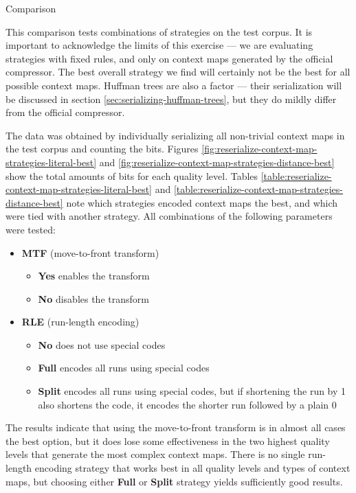 \documentclass[english,master,dept460,male,cpp,cpdeclaration]{diploma}
\makeatletter
\renewcommand\paragraph
	{\@startsection{paragraph}{4}{\z@}
	{-3.25ex plus 1ex minus .2ex}
	{1.5ex plus .2ex}
	{\normalfont\normalsize\bfseries}}
\newcommand{\subfoursection}[1]{\paragraph{#1}}
\newcommand{\nosep}{\itemsep0em}
\makeatother
\begin{document}
			\subfoursection{Comparison}
			
			This comparison tests combinations of strategies on the test corpus. It is important to acknowledge the limits of this exercise --- we are evaluating  strategies with fixed rules, and only on context maps generated by the official compressor. The best overall strategy we find will certainly not be the best for all possible context maps. Huffman trees are also a factor --- their serialization will be discussed in section \ref{sec:serializing-huffman-trees}, but they do mildly differ from the official compressor.
			
			The data was obtained by individually serializing all non-trivial context maps in the test corpus and counting the bits. Figures \ref{fig:reserialize-context-map-strategies-literal-best} and \ref{fig:reserialize-context-map-strategies-distance-best} show the total amounts of bits for each quality level. Tables \ref{table:reserialize-context-map-strategies-literal-best} and \ref{table:reserialize-context-map-strategies-distance-best} note which strategies encoded context maps the best, and which were tied with another strategy. All combinations of the following parameters were tested:
			
			\begin{itemize} \nosep
				\item \textbf{MTF} (move-to-front transform)
					\begin{itemize} \nosep
						\item \textbf{Yes} enables the transform
						\item \textbf{No} disables the transform
					\end{itemize}
				\item \textbf{RLE} (run-length encoding)
					\begin{itemize} \nosep
						\item \textbf{No} does not use special codes
						\item \textbf{Full} encodes all runs using special codes
						\item \textbf{Split} encodes all runs using special codes, but if shortening the run by 1 also shortens the code, it encodes the shorter run followed by a plain 0
					\end{itemize}
			\end{itemize}
			
			\noindent
			The results indicate that using the move-to-front transform is in almost all cases the best option, but it does lose some effectiveness in the two highest quality levels that generate the most complex context maps. There is no single run-length encoding strategy that works best in all quality levels and types of context maps, but choosing either \textbf{Full} or \textbf{Split} strategy yields sufficiently good results.
			
\end{document}
